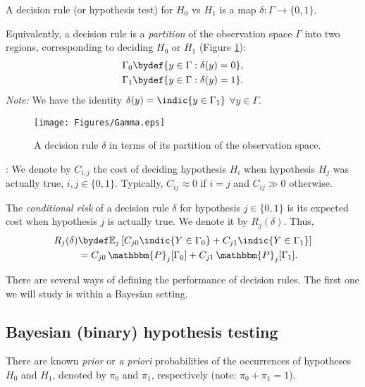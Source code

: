 \documentclass[12pt]{report}
\begin{document}
\begin{defn}
A decision rule (or hypothesis test) for $H_0$ vs $H_1$ is a map $\delta: \Gamma \to \{0, 1\}$.
\end{defn}

Equivalently, a decision rule is a {\em partition} of the observation space $\Gamma$ into two regions, corresponding to deciding $H_0$ or $H_1$ (Figure \ref{fig:decrule}):
\begin{align*}
\Gamma_0 &\bydef \{y \in \Gamma: \delta(y) = 0\}, \\
\Gamma_1 &\bydef \{y \in \Gamma: \delta(y) = 1\}. 
\end{align*}
{\em Note:} We have the identity $\delta(y) = \indic{y \in \Gamma_1}$ $\forall y \in \Gamma$. \\

\begin{figure}[htbp]
\begin{center}
\texttt{[image: Figures/Gamma.eps]}
\caption{A decision rule $\delta$ in terms of its partition of the observation space.}
\label{fig:decrule}
\end{center}
\end{figure}

: We denote by $C_{i,j}$ the cost of deciding hypothesis $H_i$ when hypothesis $H_j$ was actually true, $i, j \in \{0,1\}$. Typically, $C_{ij} \approx 0$ if $i = j$ and $C_{ij} \gg 0$ otherwise.

\begin{defn}
The {\em conditional risk} of a decision rule $\delta$ for hypothesis $j \in \{0,1\}$ is its expected cost when hypothesis $j$ is actually true. We denote it by $R_j(\delta)$. Thus, 
\begin{align*}
R_j(\delta) &\bydef \mathbb{E}_j\left[ C_{j0}\indic{Y \in \Gamma_0} + C_{j1}\indic{Y \in \Gamma_1} \right] \\
&= C_{j0} \, \mathbbm{P}_j[\Gamma_0] + C_{j1} \, \mathbbm{P}_j[\Gamma_1].
\end{align*}
\end{defn}

There are several ways of defining the performance of decision rules. The first one we will study is within a Bayesian setting.

\subsection{Bayesian (binary) hypothesis testing}
\begin{assum}
There are known {\em prior} or {\em a priori} probabilities of the occurrences of hypotheses $H_0$ and $H_1$, denoted by $\pi_0$ and $\pi_1$, respectively (note: $\pi_0 + \pi_1 = 1$).
\end{assum}
\end{document}
